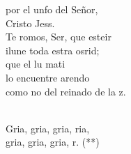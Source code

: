 \documentclass[12pt]{article}
\begin{document}
\begin{multicols*}{2}
\begin{cancion}
	por el unfo del Señor, \\
	Cristo Jess. \\
\jump
	Te romos, Ser, que esteir\\
	ilune toda estra osrid; \\
	que el lu mati\\
	lo encuentre arendo\\
	como no del reinado de la z.\\\jump\\
	\begin{chorus}%
	Gria, gria, gria, ria,\\
	gria, gria, gria, r. (**)\\
	\end{chorus}%
	\jump\\
\end{cancion}%


\end{multicols*}
\end{document}
